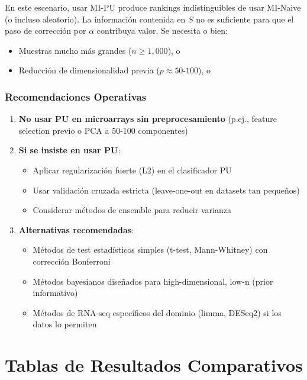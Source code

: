 \documentclass[a4paper,11pt]{article}
\begin{document}
En este escenario, usar MI-PU produce rankings indistinguibles de usar MI-Naive (o incluso aleatorio). La información contenida en $S$ no es suficiente para que el paso de corrección por $\alpha$ contribuya valor. Se necesita o bien:
\begin{itemize}
    \item Muestras mucho más grandes ($n \geq 1{,}000$), o
    \item Reducción de dimensionalidad previa ($p \approx 50$-$100$), o
\end{itemize}


\subsubsection{Recomendaciones Operativas}

\begin{enumerate}
    \item \textbf{No usar PU en microarrays sin preprocesamiento} (p.ej., feature selection previo o PCA a 50-100 componentes)
    
    \item \textbf{Si se insiste en usar PU}:
    \begin{itemize}
        \item Aplicar regularización fuerte (L2) en el clasificador PU
        \item Usar validación cruzada estricta (leave-one-out en datasets tan pequeños)
        \item Considerar métodos de ensemble para reducir varianza
    \end{itemize}
    
    \item \textbf{Alternativas recomendadas}:
    \begin{itemize}
        \item Métodos de test estadísticos simples (t-test, Mann-Whitney) con corrección Bonferroni
        \item Métodos bayesianos diseñados para high-dimensional, low-n (prior informativo)
        \item Métodos de RNA-seq específicos del dominio (limma, DESeq2) si los datos lo permiten
    \end{itemize}
\end{enumerate}


\section{Tablas de Resultados Comparativos}
\end{document}
